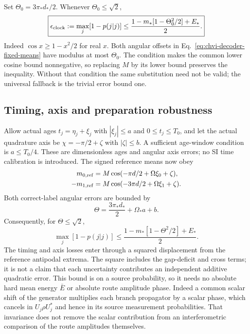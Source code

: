 Set $\Theta_0=3\pi_*d_*/2$. Whenever $\Theta_0\leq\sqrt2$,
\begin{equation}
 \boxed{\begin{gathered}
 \epsilon_{\rm clock}:=\max_j[1-p(j|j)]
 \leq\frac{1-m_*[1-\Theta_0^2/2]+E_*}{2}.
 \end{gathered}}
\label{eq:chvi-decoder-nominal-error}
\end{equation}
Indeed $\cos x\geq1-x^2/2$ for real $x$. Both angular offsets in
Eq.~\eqref{eq:chvi-decoder-fixed-means} have modulus at most $\Theta_0$.
The condition makes the common lower cosine bound nonnegative, so
replacing $M$ by its lower bound preserves the inequality. Without
that condition the same substitution need not be valid; the universal
fallback is the trivial error bound one.

\subsection{Timing, axis and preparation robustness}

Allow actual ages $t_j=\eta_j+\xi_j$ with $|\xi_j|\leq a$ and
$0\leq t_j\leq T_0$, and let the actual quadrature axis be
$\chi=-\pi/2+\zeta$ with $|\zeta|\leq b$. A sufficient age-window
condition is $a\leq T_0/4$. These are dimensionless ages and angular
axis errors; no SI time calibration is introduced.
The signed reference means now obey
\begin{equation}
\begin{aligned}
 m_{0,\rm ref}&=M\cos(-\pi d/2+\Omega\xi_0+\zeta),\\
 -m_{1,\rm ref}&=M\cos(-3\pi d/2+\Omega\xi_1+\zeta).
\end{aligned}
\label{eq:chvi-decoder-jittered-means}
\end{equation}
Both correct-label angular errors are bounded by
\begin{equation}
 \Theta=\frac{3\pi_*d_*}{2}+\Omega_*a+b.
\label{eq:chvi-decoder-angle-budget}
\end{equation}
Consequently, for $\Theta\leq\sqrt2$,
\begin{equation}
 \max_j[1-p(j|j)]
 \leq\frac{1-m_*[1-\Theta^2/2]+E_*}{2}.
\label{eq:chvi-decoder-jitter-error}
\end{equation}
The timing and axis losses enter through a squared displacement from the
reference antipodal extrema. The square includes the gap-deficit and
cross terms; it is not a claim that each uncertainty contributes an
independent additive quadratic error. This bound is on a source
probability, so it needs no absolute hard mean energy $\bar E$ or
absolute route amplitude phase. Indeed a common scalar shift of the
generator multiplies each branch propagator by a scalar phase, which
cancels in $U_j\rho U_j^*$ and hence in its source measurement
probabilities. That invariance does not remove the scalar contribution
from an interferometric comparison of the route amplitudes themselves.

